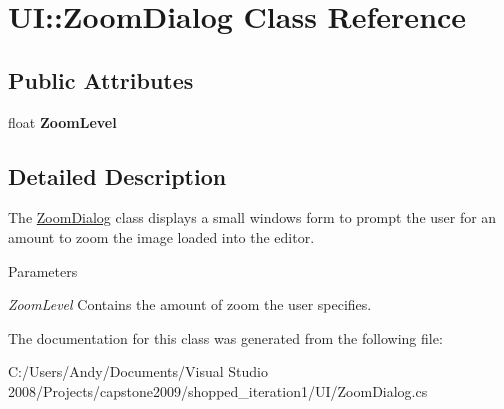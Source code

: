\hypertarget{class_u_i_1_1_zoom_dialog}{
\section{UI::ZoomDialog Class Reference}
\label{class_u_i_1_1_zoom_dialog}
}
\subsection*{Public Attributes}
\begin{DoxyCompactItemize}
\item 
\hypertarget{class_u_i_1_1_zoom_dialog_a99f9c71d0231478132d8f0c4c708d4b1}{
float {\bfseries ZoomLevel}}
\label{class_u_i_1_1_zoom_dialog_a99f9c71d0231478132d8f0c4c708d4b1}

\end{DoxyCompactItemize}


\subsection{Detailed Description}
The \hyperlink{class_u_i_1_1_zoom_dialog}{ZoomDialog} class displays a small windows form to prompt the user for an amount to zoom the image loaded into the editor.


\begin{DoxyParams}{Parameters}
\item[{\em ZoomLevel}]Contains the amount of zoom the user specifies. \end{DoxyParams}


The documentation for this class was generated from the following file:\begin{DoxyCompactItemize}
\item 
C:/Users/Andy/Documents/Visual Studio 2008/Projects/capstone2009/shopped\_\-iteration1/UI/ZoomDialog.cs\end{DoxyCompactItemize}

